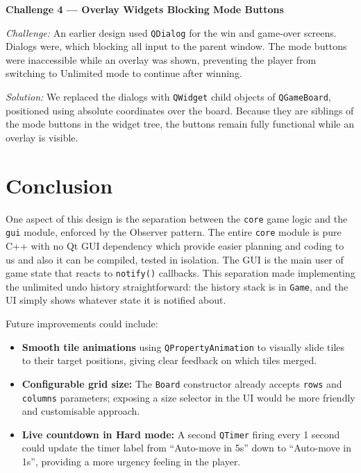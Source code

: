 \documentclass[a4paper,12pt]{article}
\begin{document}
\textbf{Challenge 4 --- Overlay Widgets Blocking Mode Buttons}

\textit{Challenge:} An earlier design used \texttt{QDialog} for the win and game-over screens. Dialogs were, which blocking all input to the parent window. The mode buttons were inaccessible while an overlay was shown, preventing the player from switching to Unlimited mode to continue after winning.

\textit{Solution:} We replaced the dialogs with \texttt{QWidget} child objects of \texttt{QGameBoard}, positioned using absolute coordinates over the board. Because they are siblings of the mode buttons in the widget tree, the buttons remain fully functional while an overlay is visible. 
\newpage
\section{Conclusion}

One aspect of this design is the separation between the \texttt{core} game logic and the \texttt{gui} module, enforced by the Observer pattern. The entire \texttt{core} module is pure C++ with no Qt GUI dependency which provide easier planning and coding to us and also it can be compiled, tested in isolation. The GUI is the main user of game state that reacts to \texttt{notify()} callbacks. This separation made implementing the unlimited undo history straightforward: the history stack is in \texttt{Game}, and the UI simply shows whatever state it is notified about.

Future improvements could include:
\begin{itemize}
    \item \textbf{Smooth tile animations} using \texttt{QPropertyAnimation} to visually slide tiles to their target positions, giving clear feedback on which tiles merged.
    \item \textbf{Configurable grid size:} The \texttt{Board} constructor already accepts \texttt{rows} and \texttt{columns} parameters; exposing a size selector in the UI would be more friendly and customisable approach.
   \item \textbf{Live countdown in Hard mode:} A second \texttt{QTimer} firing every 1 second could update the timer label from ``Auto-move in 5s'' down to ``Auto-move in 1s'', providing a more urgency feeling in the player.
\end{itemize}
\end{document}

